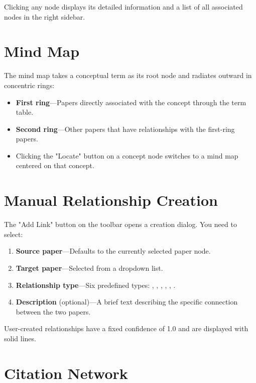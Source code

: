 Clicking any node displays its detailed information and a list of all associated nodes in the right
sidebar.

\section{Mind Map}


The mind map takes a conceptual term as its root node and radiates outward in concentric rings:

\begin{itemize}
  \item \textbf{First ring}---Papers directly associated with the concept through the term table.
  \item \textbf{Second ring}---Other papers that have  relationships with the
    first-ring papers.
  \item Clicking the "Locate" button on a concept node switches to a mind map centered on that
    concept.
\end{itemize}

\section{Manual Relationship Creation}

The "Add Link" button on the toolbar opens a creation dialog. You need to select:

\begin{enumerate}
  \item \textbf{Source paper}---Defaults to the currently selected paper node.
  \item \textbf{Target paper}---Selected from a dropdown list.
  \item \textbf{Relationship type}---Six predefined types: ,
    , , , , .
  \item \textbf{Description} (optional)---A brief text describing the specific connection between
    the two papers.
\end{enumerate}

User-created relationships have a fixed confidence of 1.0 and are displayed with solid lines.

\section{Citation Network}


